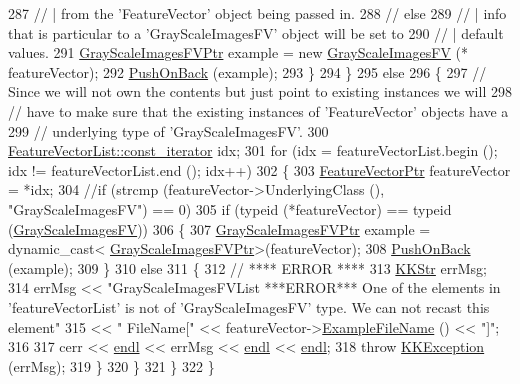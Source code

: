 \begin{DoxyCode}
287       \textcolor{comment}{//   | from the 'FeatureVector' object being passed in.}
288       \textcolor{comment}{// else}
289       \textcolor{comment}{//   | info that is particular to a 'GrayScaleImagesFV' object will be set to}
290       \textcolor{comment}{//   | default values.}
291       \hyperlink{class_k_k_m_l_l_1_1_gray_scale_images_f_v}{GrayScaleImagesFVPtr}  example = \textcolor{keyword}{new} \hyperlink{class_k_k_m_l_l_1_1_gray_scale_images_f_v}{GrayScaleImagesFV} (*
      featureVector);
292       \hyperlink{class_k_k_m_l_l_1_1_feature_vector_list_abd43779a90a6aa3db1de8092be877bdb}{PushOnBack} (example);
293     \}
294   \}
295   \textcolor{keywordflow}{else}
296   \{
297     \textcolor{comment}{// Since we will not own the contents but just point to existing instances we will }
298     \textcolor{comment}{// have to make sure that the existing instances of 'FeatureVector' objects have a }
299     \textcolor{comment}{// underlying type of 'GrayScaleImagesFV'.}
300     \hyperlink{class_k_k_b_1_1_k_k_queue_aeb057c9c010446f46f57c1e355f981f1}{FeatureVectorList::const\_iterator}  idx;
301     \textcolor{keywordflow}{for}  (idx = featureVectorList.begin ();  idx != featureVectorList.end ();  idx++)
302     \{
303       \hyperlink{class_k_k_m_l_l_1_1_feature_vector}{FeatureVectorPtr} featureVector = *idx;
304       \textcolor{comment}{//if  (strcmp (featureVector->UnderlyingClass (), "GrayScaleImagesFV") == 0)}
305       \textcolor{keywordflow}{if}  (\textcolor{keyword}{typeid} (*featureVector) == \textcolor{keyword}{typeid} (\hyperlink{class_k_k_m_l_l_1_1_gray_scale_images_f_v}{GrayScaleImagesFV}))
306       \{
307         \hyperlink{class_k_k_m_l_l_1_1_gray_scale_images_f_v}{GrayScaleImagesFVPtr} example = \textcolor{keyword}{dynamic\_cast<}
      \hyperlink{class_k_k_m_l_l_1_1_gray_scale_images_f_v}{GrayScaleImagesFVPtr}\textcolor{keyword}{>}(featureVector);
308         \hyperlink{class_k_k_m_l_l_1_1_feature_vector_list_abd43779a90a6aa3db1de8092be877bdb}{PushOnBack} (example);
309       \}
310       \textcolor{keywordflow}{else}
311       \{
312         \textcolor{comment}{// ****    ERROR  ****}
313         \hyperlink{class_k_k_b_1_1_k_k_str}{KKStr} errMsg;
314         errMsg << \textcolor{stringliteral}{"GrayScaleImagesFVList   ***ERROR***   One of the elements in 'featureVectorList' is not
       of 'GrayScaleImagesFV'  type.  We can not recast this element"}
315              << \textcolor{stringliteral}{" FileName["} << featureVector->\hyperlink{class_k_k_m_l_l_1_1_feature_vector_ab47c89ab1e9396664fdc0dc34b6e1ab5}{ExampleFileName} () << \textcolor{stringliteral}{"]"};
316 
317         cerr << \hyperlink{namespace_k_k_b_ad1f50f65af6adc8fa9e6f62d007818a8}{endl} << errMsg << \hyperlink{namespace_k_k_b_ad1f50f65af6adc8fa9e6f62d007818a8}{endl} << \hyperlink{namespace_k_k_b_ad1f50f65af6adc8fa9e6f62d007818a8}{endl};
318         \textcolor{keywordflow}{throw} \hyperlink{class_k_k_b_1_1_k_k_exception}{KKException} (errMsg);
319       \}
320     \}
321   \}
322 \}
\end{DoxyCode}
